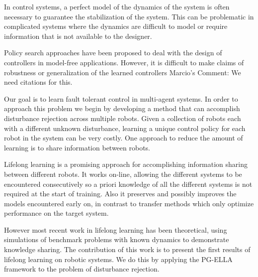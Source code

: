 \documentclass{aamas2016}
\begin{document}
%

In control systems, a perfect model of the dynamics of the system is often necessary to guarantee the stabilization of the system. This can be problematic in complicated systems where the dynamics are difficult to model or require information that is not available to the designer. %


Policy search approaches have been proposed to deal with the design of controllers in model-free applications.
However, it is difficult to make claims of robustness or generalization of the learned controllers {\color{red} Marcio's Comment: 
We need citations for this}.

Our goal is to learn fault tolerant control in multi-agent systems. In order to approach this problem we begin by developing a method that can accomplish disturbance rejection across multiple robots. 
Given a collection of robots each with a different unknown disturbance, learning a unique control policy for each robot in the system can be very costly. One approach to reduce the amount of learning is to share information between robots. 

Lifelong learning \cite{Ruvolo2013} is a promising approach for accomplishing information sharing between different robots. It works on-line, allowing the different systems to be encountered consecutively so a priori knowledge of all the different systems is not required at the start of training. Also it preserves and possibly improves the models encountered early on, in contrast to transfer methods which only optimize performance on the target system.

However most recent work in lifelong learning \cite{Ruvolo2013,BouAmmar2014a,bouAmmar2015unsupervised} has been theoretical, using simulations of benchmark problems with known dynamics to demonstrate knowledge sharing. The contribution of this work is to present the first results of lifelong learning on robotic systems. We do this by applying the PG-ELLA framework \cite{BouAmmar2014a} to the problem of disturbance rejection.
\end{document}
